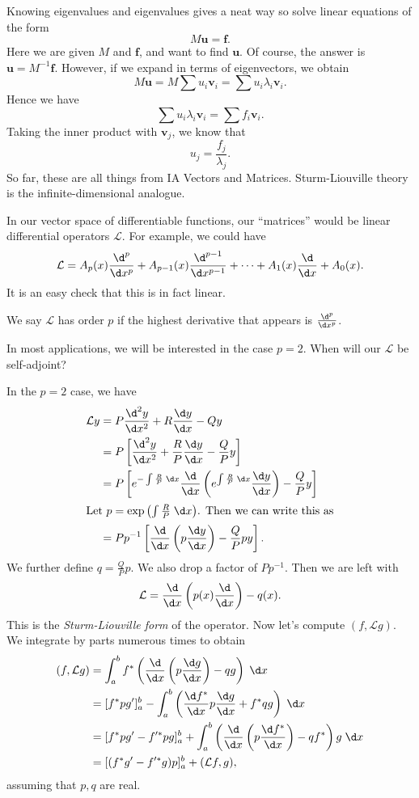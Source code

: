 \documentclass[a4paper]{article}
\begin{document}
Knowing eigenvalues and eigenvalues gives a neat way so solve linear equations of the form
\[
  M \mathbf{u} = \mathbf{f}.
\]
Here we are given $M$ and $\mathbf{f}$, and want to find $\mathbf{u}$. Of course, the answer is $\mathbf{u} = M^{-1}\mathbf{f}$. However, if we expand in terms of eigenvectors, we obtain
\[
  M\mathbf{u} = M\sum u_i \mathbf{v}_i = \sum u_i \lambda_i \mathbf{v}_i.
\]
Hence we have
\[
  \sum u_i \lambda_i \mathbf{v}_i = \sum f_i \mathbf{v}_i.
\]
Taking the inner product with $\mathbf{v}_j$, we know that
\[
  u_j = \frac{f_j}{\lambda_j}.
\]
So far, these are all things from IA Vectors and Matrices. Sturm-Liouville theory is the infinite-dimensional analogue.

In our vector space of differentiable functions, our ``matrices'' would be linear differential operators $\mathcal{L}$. For example, we could have
\[
  \mathcal{L} = A_p(x) \frac{\d^p}{\d x^p} + A_{p - 1}(x) \frac{\d^{p - 1}}{\d x^{p - 1}} + \cdots + A_1(x)\frac{\d}{\d x} + A_0(x).
\]
It is an easy check that this is in fact linear.

We say $\mathcal{L}$ has order $p$ if the highest derivative that appears is $\frac{\d^p}{\d x^p}$.

In most applications, we will be interested in the case $p = 2$. When will our $\mathcal{L}$ be self-adjoint?

In the $p = 2$ case, we have
\begin{align*}
  \mathcal{L} y &= P \frac{\d^2 y}{\d x^2} + R \frac{\d y}{\d x} - Q y \\
  &= P\left[\frac{\d^2 y}{\d x^2} + \frac{R}{P}\frac{\d y}{\d x} - \frac{Q}{P}y\right] \\
  &= P\left[e^{-\int \frac{R}{P}\;\d x}\frac{\d}{\d x}\left(e^{\int \frac{R}{P}\;\d x}\frac{\d y}{\d x}\right)- \frac{Q}{P}y\right]\\
  \intertext{Let $p = \exp\left(\int \frac{R}{P}\;\d x\right)$. Then we can write this as}
  &= P p^{-1}\left[\frac{\d}{\d x}\left(p\frac{\d y}{\d x}\right) - \frac{Q}{P}p y\right].
\end{align*}
We further define $q = \frac{Q}{P}p$. We also drop a factor of $Pp^{-1}$. Then we are left with
\[
  \mathcal{L} = \frac{\d}{\d x}\left(p(x)\frac{\d}{\d x}\right) - q(x).
\]
This is the \emph{Sturm-Liouville form} of the operator. Now let's compute $(f, \mathcal{L}g)$. We integrate by parts numerous times to obtain
\begin{align*}
  (f, \mathcal{L}g) &= \int_a^b f^*\left(\frac{\d}{\d x}\left(p \frac{\d g}{\d x}\right) - qg\right)\;\d x \\
  &= [f^* pg']_a^b - \int_a^b \left(\frac{\d f^*}{\d x}p\frac{\d g}{\d x} + f^* qg\right)\;\d x\\
  &= [f^*pg' - f'^*pg]_a^b + \int_a^b \left(\frac{\d}{\d x}\left(p\frac{\d f^*}{\d x}\right) - qf^*\right)g\;\d x\\
  &= [(f^*g' - f'^*g)p]_a^b + (\mathcal{L}f, g),
\end{align*}
assuming that $p, q$ are real.
\end{document}
